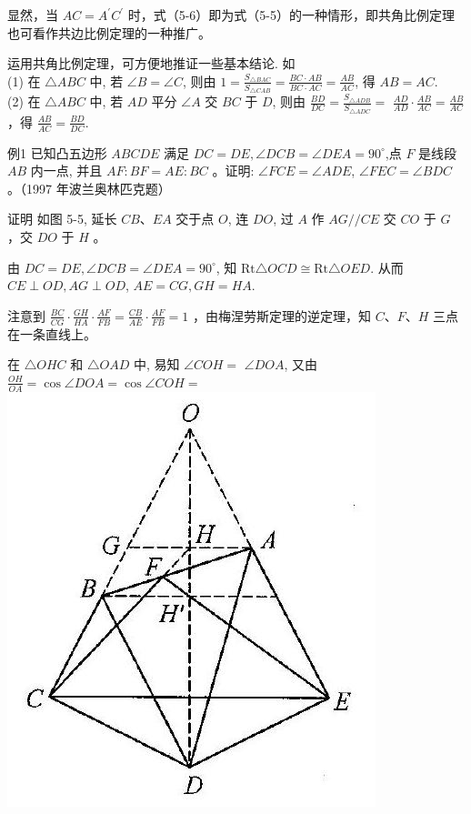 \documentclass[10pt]{article}
\begin{document}
显然，当 $A C=A^{\prime} C^{\prime}$ 时，式（5-6）即为式（5-5）的一种情形，即共角比例定理也可看作共边比例定理的一种推广。

运用共角比例定理，可方便地推证一些基本结论. 如\\
(1) 在 $\triangle A B C$ 中, 若 $\angle B=\angle C$, 则由 $1=\frac{S_{\triangle B A C}}{S_{\triangle C A B}}=\frac{B C \cdot A B}{B C \cdot A C}=\frac{A B}{A C}$, 得 $A B=A C$.\\
(2) 在 $\triangle A B C$ 中, 若 $A D$ 平分 $\angle A$ 交 $B C$ 于 $D$, 则由 $\frac{B D}{D C}=\frac{S_{\triangle A D B}}{S_{\triangle A D C}}=$ $\frac{A D}{A D} \cdot \frac{A B}{A C}=\frac{A B}{A C}$ ，得 $\frac{A B}{A C}=\frac{B D}{D C}$.

例1 已知凸五边形 $A B C D E$ 满足 $D C=D E, \angle D C B=\angle D E A=90^{\circ}$,点 $F$ 是线段 $A B$ 内一点, 并且 $A F: B F=A E: B C$ 。证明: $\angle F C E=\angle A D E$, $\angle F E C=\angle B D C$ 。（1997 年波兰奥林匹克题）

证明 如图 5-5, 延长 $C B 、 E A$ 交于点 $O$, 连 $D O$, 过 $A$ 作 $A G / / C E$ 交 $C O$ 于 $G$ ，交 $D O$ 于 $H$ 。

由 $D C=D E, \angle D C B=\angle D E A=90^{\circ}$, 知 $\mathrm{Rt} \triangle O C D \cong \mathrm{Rt} \triangle O E D$. 从而 $C E \perp O D, A G \perp O D$, $A E=C G, G H=H A$.

注意到 $\frac{B C}{C G} \cdot \frac{G H}{H A} \cdot \frac{A F}{F B}=\frac{C B}{A E} \cdot \frac{A F}{F B}=1$ ，由梅涅劳斯定理的逆定理，知 $C 、 F 、 H$ 三点在一条直线上。

在 $\triangle O H C$ 和 $\triangle O A D$ 中, 易知 $\angle C O H=$ $\angle D O A$, 又由 $\frac{O H}{O A}=\cos \angle D O A=\cos \angle C O H=$\\
\includegraphics[max width=\textwidth, center]{2024_10_30_2c8f45efd4a519b08e1ag-049(1)}
\end{document}
